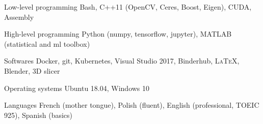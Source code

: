 


\begin{cvskills}


\cvskill
{Low-level programming} %
{Bash, C++11 (OpenCV, Ceres, Boost, Eigen), CUDA, Assembly} %


\cvskill
{High-level programming} %
{Python (numpy, tensorflow, jupyter), MATLAB (statistical and ml toolbox)} %


\cvskill
{Softwares} %
{Docker, git, Kubernetes, Visual Studio 2017, Binderhub, \textsc{\LaTeX}, Blender, 3D slicer} %


\cvskill
{Operating systems} %
{Ubuntu 18.04, Windows 10} %


\cvskill
{Languages} %
{French (mother tongue), Polish (fluent), English (professional, TOEIC 925), Spanish (basics)} %


\end{cvskills}
